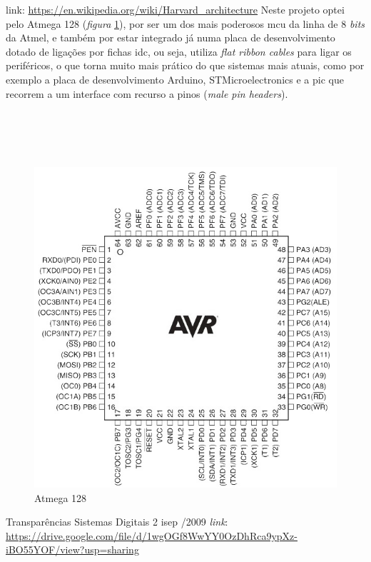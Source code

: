 \qquad link: \url{https://en.wikipedia.org/wiki/Harvard_architecture}
\newpage
Neste projeto optei pelo Atmega 128 (\textit{figura} \ref{Atmega_128_pinagem}), por ser um dos mais poderosos \ac{mcu} da linha de 8 \textit{bits} da Atmel, e também por estar integrado já numa placa de desenvolvimento dotado de ligações por fichas \ac{idc}, ou seja, utiliza \textit{flat ribbon cables} para ligar os periféricos, o que torna muito mais prático do que sistemas mais atuais, como por exemplo a placa de desenvolvimento Arduino, STMicroelectronics e a \ac{pic} que recorrem a um interface com recurso a pinos (\textit{male pin headers}).
\\
\\
\\
\\
\\
\begin{figure}[H]
	\centering
	\includegraphics[scale=0.7]{./image/PESTA/material/Atmega128_1.jpg}
	\caption{Atmega 128}
	\label{Atmega_128_pinagem}
\end{figure}
{Transparências Sistemas Digitais 2 \quad \acs{isep} /2009 \quad \textit{link}}:
\\
\url{https://drive.google.com/file/d/1wgOGf8WwYY0OzDhRca9ypXz-iBO55YOF/view?usp=sharing}
